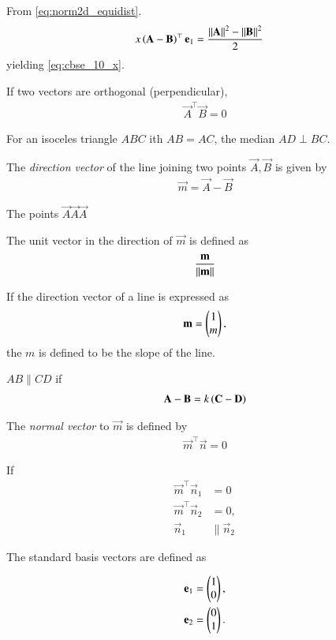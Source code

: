   \solution 
  From \eqref{eq:norm2d_equidist}.
  \begin{align}
	   x\left(\mathbf{A}-\mathbf{B}\right)^{\top }\mathbf{e}_1
		  &=
	  \frac{\left\lVert\mathbf{A}\right\rVert^2 -\left\lVert\mathbf{B}\right\rVert^2 }{2}
   \end{align}
	  yielding \eqref{eq:cbse_10_x}.
  \item If two vectors are orthogonal (perpendicular), 
  \begin{align}
    \label{eq:angle2d_orth}
\vec{A}^{\top} \vec{B} = 0
  \end{align}
  \item For an isoceles triangle $ABC$ ith $AB = AC$, the median $AD \perp BC$.
    \label{prop:two-isosc}

  \item The {\em direction vector} of the line joining two points $\vec{A},\vec{B}$ is given by 
  \begin{align}
    \label{eq:dir_vec}
    \vec{m} = \vec{A}-\vec{B}
  \end{align}
  \item The points $\vec{A}\vec{A}\vec{A}$
\item The unit vector in the direction of $\vec{m}$ is defined as
\begin{align}
    \frac{\mathbf{m}}{\left\lVert\mathbf{m}\right\rVert}
\end{align}
\item If the direction vector of a line is expressed as 
		\label{prop:two-dir-vec}
	\begin{align}
		\label{eq:two-dir-vec}
    \mathbf{m} = \begin{pmatrix}1\\m\end{pmatrix},
\end{align}
 the $m$ is defined to be the {\em} slope of the line. 
  \item $AB \parallel CD$ if 
	  \label{prop:two-par-dir-vec}
  \begin{align}
	  \mathbf{A}- \mathbf{B}= k\left(\mathbf{C}- \mathbf{D}\right)
	  \label{eq:two-par-dir-vec}
  \end{align}
  \item The {\em normal vector} to $\vec{m}$ is defined by 
  \begin{align}
    \label{eq:normal_vec}
    \vec{m}^{\top}  \vec{n} = 0
  \end{align}
  \item  If
	  \label{prop:two-orth-para}
\begin{align}
	\vec{m}^{\top}  \vec{n}_1 &= 0
	\\
	\vec{m}^{\top}  \vec{n}_2 &= 0,
	\\
	\vec{n}_1 &\parallel \vec{n}_2
	  \label{eq:two-orth-para}
\end{align}
\item  The standard basis vectors are defined as 
	\label{def:matrix-two}

  \begin{align}
  \mathbf{e}_1&= \begin{pmatrix}1\\0\end{pmatrix}, 
  \\
  \mathbf{e}_2&= \begin{pmatrix}0\\1\end{pmatrix}.
  \end{align}
\fi
